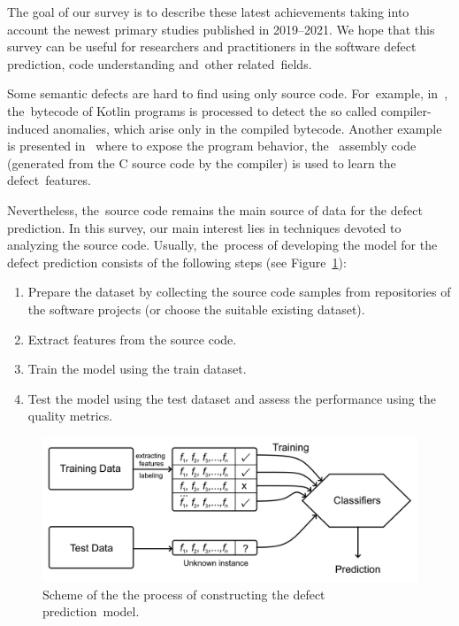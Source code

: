 \documentclass[mathematics,review,accept,moreauthors,pdftex]{Definitions/mdpi}
\begin{document}
The goal of our survey is to describe these latest achievements taking into account the newest primary studies published in 2019--2021. We hope that this survey can be useful for researchers and practitioners in the software defect prediction, code understanding and~other related~fields.

Some semantic defects are hard to find using only source code. For~example, in~\cite{BryksinEtAl2020}, the~bytecode of Kotlin programs is processed to detect the so called compiler-induced anomalies, which arise only in the compiled bytecode. Another example is presented in~\cite{PhanNguyen2017} where to expose the program behavior, the~
assembly code (generated from the C source code by the compiler) is used to learn the defect~features.

Nevertheless, the~source code remains the main source of data for the defect prediction. 
In this survey, our main interest lies in techniques devoted to analyzing the source code. Usually, the~process of developing the model for the defect prediction consists of the following steps (see Figure~\ref{fig1}):
\begin{enumerate}
\item Prepare the dataset by collecting the source code samples from repositories of the software projects (or choose the suitable existing dataset).
\item Extract features from the source code.
\item Train the model using the train dataset.
\item Test the model using the test dataset and assess the performance using the quality metrics.
\end{enumerate}

\begin{figure}[H] %
\includegraphics[width=11.5 cm]{f1.png}
\caption{Scheme of the the process of constructing the defect prediction~model.}
\label{fig1} %
\end{figure}
\end{document}
